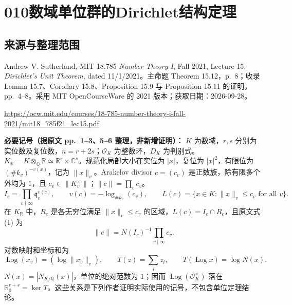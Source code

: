 \documentclass[UTF8,11pt]{ctexart}
\begin{document}
\section*{010\quad 数域单位群的Dirichlet结构定理}
\subsection*{来源与整理范围}
Andrew V. Sutherland, MIT 18.785 \emph{Number Theory I}, Fall 2021, Lecture 15, \emph{Dirichlet's Unit Theorem}, dated 11/1/2021。主命题 Theorem 15.12，p.~8；收录 Lemma 15.7、Corollary 15.8、Proposition 15.9 与 Proposition 15.11 的证明，pp.~4--8。采用 MIT OpenCourseWare 的 2021 版本；获取日期：2026-09-28。
\par\url{https://ocw.mit.edu/courses/18-785-number-theory-i-fall-2021/mit18_785f21_lec15.pdf}

\textbf{必要记号（据原文 pp.~1--3、5--6 整理，非新增证明）：}
$K$ 为数域，$r,s$ 分别为实位数及复位数，$n=r+2s$；$\mathcal O_K$ 为整数环，$D_K$ 为判别式。$K_{\mathbb R}=K\otimes_{\mathbb Q}\mathbb R\simeq\mathbb R^r\times\mathbb C^s$。规范化局部大小在实位为 $|x|$，复位为 $|x|^2$，有限位为 $(\#k_v)^{-v(x)}$，记为 $\|x\|_v$。Arakelov divisor $c=(c_v)$ 是正数族，除有限多个外均为 $1$，且 $c_v\in\|K_v^\times\|$；$\|c\|=\prod_v c_v$。
\[
I_c=\prod_{v\nmid\infty}\mathfrak q_v^{v(c)},\qquad
v(c)=-\log_{\#k_v}(c_v),\qquad
L(c)=\{x\in K:\|x\|_v\leq c_v\text{ for all }v\}.
\]
在 $K_{\mathbb R}$ 中，$R_c$ 是各无穷位满足 $\|x\|_v\leq c_v$ 的区域，$L(c)=I_c\cap R_c$，且原文式 (1) 为
\[
\|c\|=N(I_c)^{-1}\prod_{v\mid\infty}c_v.\tag{1}
\]
对数映射和坐标和为
\[
\operatorname{Log}(x_v)=(\log\|x_v\|_v),\qquad T(z)=\sum_i z_i,
\qquad T(\operatorname{Log}x)=\log N(x).
\]
$N(x)=|N_{K/\mathbb Q}(x)|$，单位的绝对范数为 $1$；因而 $\operatorname{Log}(\mathcal O_K^\times)$ 落在 $\mathbb R^{r+s}_0=\ker T$。这些关系是下列作者证明实际使用的记号，不包含单位定理结论。
\end{document}
